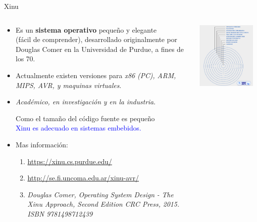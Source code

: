 \documentclass[8pt,aspectratio=169,compress]{beamer}
\begin{document}
\begin{frame}{Xinu}

    \begin{columns}[onlytextwidth,T]
      \column{\dimexpr\linewidth-70mm-5mm}

\begin{small}
	\begin{itemize}
\item[Xinu] Es un \textbf{sistema operativo} pequeño y elegante \\ (fácil de comprender), desarrollado originalmente por Douglas Comer en la Universidad de Purdue, a fines de los 70. 
\item[Versiones] Actualmente existen versiones para \textit{x86 (PC), ARM, MIPS, AVR, y maquinas virtuales}. 
\item[USO] \textit{Académico, en investigación y en la industria}.

\bigskip
Como el tamaño del código fuente es pequeño \\ \textcolor{blue}{Xinu es adecuado en sistemas embebidos.}
\bigskip
\item [web] Mas información:
\begin{enumerate}
\item \textcolor{blue}{\footnotesize \url{https://xinu.cs.purdue.edu/}}
\item \textcolor{blue}{\footnotesize \url{http://se.fi.uncoma.edu.ar/xinu-avr/}}
\item \textit{Douglas Comer, Operating System Design - The Xinu Approach, Second Edition CRC Press, 2015. ISBN 9781498712439}
\end{enumerate}
	\end{itemize}

\end{small}


      \column{70mm}
     \includegraphics[width=60mm]{images/xinu.jpg}

    \end{columns}
\end{frame}
\end{document}
